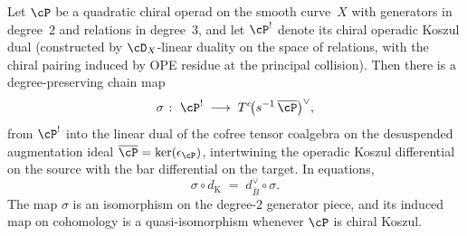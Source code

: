 \begin{lemma}
\label{lem:chiral-quadratic-koszul}
Let $\cP$ be a quadratic chiral operad on the smooth curve~$X$
with generators in degree~$2$ and relations in degree~$3$, and
let $\cP^{!}$ denote its chiral operadic Koszul dual
\textup{(}constructed by $\cD_X$-linear duality on the space
of relations, with the chiral pairing induced by OPE residue
at the principal collision\textup{)}. Then there is a
degree-preserving chain map
\[
\sigma \;\colon\; \cP^{!}
\;\longrightarrow\;
T^{c}\!\bigl(s^{-1}\,\overline{\cP}\bigr)^{\vee},
\]
from $\cP^{!}$ into the linear dual of the cofree tensor
coalgebra on the desuspended augmentation ideal
$\overline{\cP} = \ker(\epsilon_\cP)$, intertwining the
operadic Koszul differential on the source with the bar
differential on the target. In equations,
\[
\sigma \circ d_{\mathrm{K}}
\;=\;
d_{\bar{B}}^{\vee} \circ \sigma.
\]
The map $\sigma$ is an isomorphism on the degree-$2$ generator
piece, and its induced map on cohomology is a quasi-isomorphism
whenever $\cP$ is chiral Koszul.
\end{lemma}

